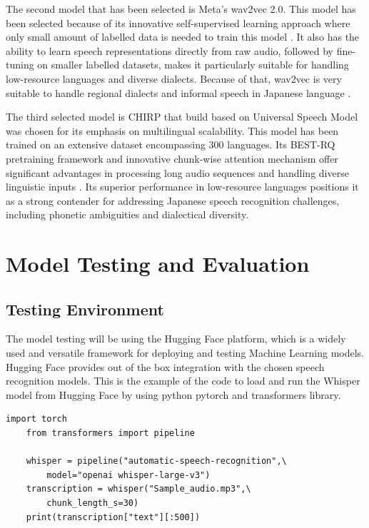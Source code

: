 The second model that has been selected is Meta’s wav2vec 2.0. This model has been selected because of its innovative self-supervised learning approach where only small amount of labelled data is needed to train this model \parencite{baevski2020wav2vec}. It also has the ability to learn speech representations directly from raw audio, followed by fine-tuning on smaller labelled datasets, makes it particularly suitable for handling low-resource languages and diverse dialects. Because of that, wav2vec is very suitable to handle  regional dialects and informal speech  in Japanese language \parencite{miwa2023dialect}. 

The third selected model is CHIRP that build based on Universal Speech Model was chosen for its emphasis on multilingual scalability. This model has been trained on an extensive dataset encompassing 300 languages. Its BEST-RQ pretraining framework and innovative chunk-wise attention mechanism offer significant advantages in processing long audio sequences and handling diverse linguistic inputs \parencite{zhang2023google}. Its superior performance in low-resource languages positions it as a strong contender for addressing Japanese speech recognition challenges, including phonetic ambiguities and dialectical diversity.


\section{Model Testing and Evaluation}
\subsection{Testing Environment}
The model testing will be using the Hugging Face platform, which is a widely used and versatile framework for deploying and testing Machine Learning models. Hugging Face provides out of the box integration with the chosen speech recognition models. This is the example of the code to load and run the Whisper model from Hugging Face by using python pytorch and transformers library.

\begin{lstlisting}[caption={Python code to load Whisper model from Hugging Face}]
    import torch
    from transformers import pipeline

    whisper = pipeline("automatic-speech-recognition",\
        model="openai whisper-large-v3")
    transcription = whisper("Sample_audio.mp3",\
        chunk_length_s=30)
    print(transcription["text"][:500])
\end{lstlisting}

